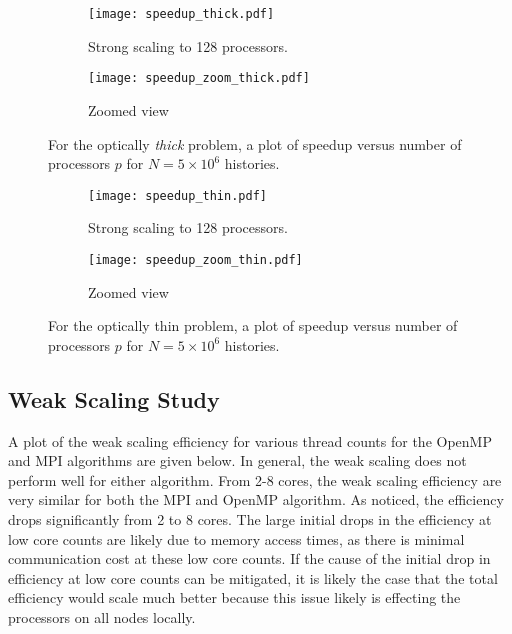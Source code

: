 \documentclass[12pt]{article}
\begin{document}
{{{{     \begin{figure}[htbp!]
         \begin{subfigure}{0.5\textwidth}
         \centering
           \texttt{[image: speedup\_thick.pdf]}
           \caption{Strong scaling to 128 processors.}
     \end{subfigure}
     \begin{subfigure}{0.5\textwidth}
         \centering
           \texttt{[image: speedup\_zoom\_thick.pdf]}
           \caption{Zoomed view}
     \end{subfigure}
     \caption{For the optically \emph{thick} problem, a plot of speedup versus number of processors $p$ for $N=5\times
               10^6$ histories.\label{thicksu}}
 \end{figure}
     \begin{figure}[htbp!]
         \begin{subfigure}{0.5\textwidth}
         \centering
           \texttt{[image: speedup\_thin.pdf]}
           \caption{Strong scaling to 128 processors.}
     \end{subfigure}
     \begin{subfigure}{0.5\textwidth}
         \centering
           \texttt{[image: speedup\_zoom\_thin.pdf]}
           \caption{Zoomed view}
     \end{subfigure}
           \caption{For the optically thin problem, a plot of speedup versus number of processors $p$ for $N=5\times
               10^6$ histories.\label{thicksu}}
 \end{figure}

\clearpage

\subsection{Weak Scaling Study}

A plot of the weak scaling efficiency for various thread counts for the OpenMP and
MPI algorithms are given below.  In general, the weak scaling does not perform well for either
algorithm.  From 2-8 cores, the weak scaling efficiency are very similar for both the
MPI and OpenMP algorithm.  As noticed, the efficiency drops significantly from 2 to 8 cores.   The large initial
drops in the efficiency at low core counts are likely due to memory access times, as
there is minimal communication cost at these low core counts.   If the cause of the initial drop in efficiency at low core counts can be mitigated, it is likely the case that the total
efficiency would scale much better because this issue likely is effecting the
processors on all nodes locally.

}}}}
\end{document}
